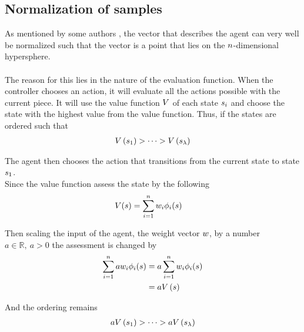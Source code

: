\subsection{Normalization of samples \label{normalSamples}}
As mentioned by some authors \citep{boumaza2009}, the vector that
describes the agent can very well be normalized such that the vector
is a point that lies on the $n$-dimensional hypersphere.\\
\\
The reason for this lies in the nature of the evaluation function.
When the controller chooses an action, it will evaluate all the
actions possible with the current piece. It will use the 
value function $V$ of each state $s_i$ and 
choose the state with the highest value from the value function.
Thus, if the states are ordered such that
\begin{align}
V \left(  s_1 \right) 
> \dots 
> V \left( s_\lambda \right)
\end{align}

The agent then chooses the action that transitions from the current state 
to state $s_1$.\\
Since the value function assess the state by the following
\begin{align}
V (s ) &= 
\sum_{i=1}^{n} w _{i}\phi _{i}(s )
\end{align}

Then scaling the input of the agent, the weight vector $w$, by a
number $a \in \mathbb{R}, \ a > 0$ the assessment is changed by
\begin{align}
\sum_{i=1}^{n} a w _{i}\phi _{i}(s ) &= 
a\sum_{i=1}^{n} w _{i}\phi _{i}(s )\\
&= a V \left( s \right)
\end{align}

And the ordering remains
\begin{align}
a V \left(  s_1 \right) 
> \dots 
> a V \left( s_\lambda \right)
\end{align}

